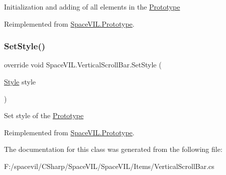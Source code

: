 Initialization and adding of all elements in the \mbox{\hyperlink{class_space_v_i_l_1_1_prototype}{Prototype}} 



Reimplemented from \mbox{\hyperlink{class_space_v_i_l_1_1_prototype_ac3379fe02923ee155b5b0084abf27420}{Space\+V\+I\+L.\+Prototype}}.

\mbox{\label{class_space_v_i_l_1_1_vertical_scroll_bar_a94bfbdb137de9b7301e6e07074eb2069}} 
\subsubsection{\texorpdfstring{Set\+Style()}{SetStyle()}}
{\footnotesize\ttfamily override void Space\+V\+I\+L.\+Vertical\+Scroll\+Bar.\+Set\+Style (\begin{DoxyParamCaption}\item[{\mbox{\hyperlink{class_space_v_i_l_1_1_decorations_1_1_style}{Style}}}]{style }\end{DoxyParamCaption})\hspace{0.3cm}{\ttfamily [virtual]}}



Set style of the \mbox{\hyperlink{class_space_v_i_l_1_1_prototype}{Prototype}} 



Reimplemented from \mbox{\hyperlink{class_space_v_i_l_1_1_prototype_ae96644a6ace490afb376fb542161e541}{Space\+V\+I\+L.\+Prototype}}.



The documentation for this class was generated from the following file\+:\begin{DoxyCompactItemize}
\item 
F\+:/spacevil/\+C\+Sharp/\+Space\+V\+I\+L/\+Space\+V\+I\+L/\+Items/Vertical\+Scroll\+Bar.\+cs\end{DoxyCompactItemize}
